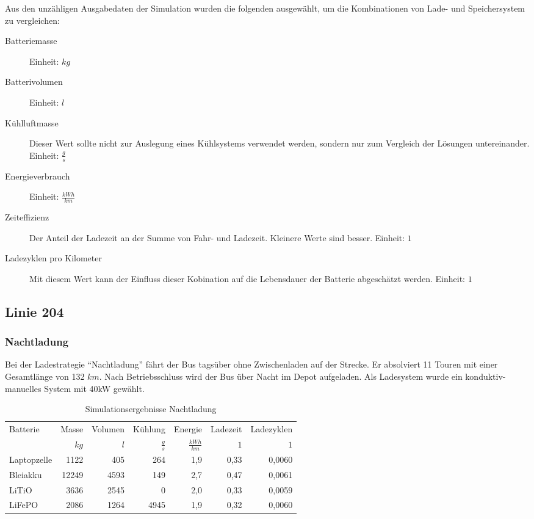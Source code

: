 Aus den unzähligen Ausgabedaten der Simulation wurden die folgenden ausgewählt, um die Kombinationen von Lade- und Speichersystem zu vergleichen:
\begin{description}
	\item[Batteriemasse] Einheit: $kg$
	\item[Batterivolumen] Einheit: $l$
	\item[Kühlluftmasse] Dieser Wert sollte nicht zur Auslegung eines Kühlsystems verwendet werden, sondern nur zum Vergleich der Lösungen untereinander.\\
	Einheit: $\frac{g}{s}$
	\item[Energieverbrauch] Einheit: $\frac{kWh}{km}$
	\item[Zeiteffizienz] Der Anteil der Ladezeit an der Summe von Fahr- und Ladezeit. Kleinere Werte sind besser.
	Einheit: $1$
	\item[Ladezyklen pro Kilometer] Mit diesem Wert kann der Einfluss dieser Kobination auf die Lebensdauer der Batterie abgeschätzt werden.
	Einheit: $1$
\end{description}

\subsection{Linie 204}
\subsubsection{Nachtladung}
Bei der Ladestrategie "`Nachtladung"' fährt der Bus tagsüber ohne Zwischenladen auf der Strecke. Er absolviert 11 Touren mit einer Gesamtlänge von 132 $km$. Nach Betriebsschluss wird der Bus über Nacht im Depot aufgeladen. Als Ladesystem wurde ein konduktiv-manuelles System mit 40kW gewählt.

\begin{table}[h!]\centering
	\begin{tabularx}{\textwidth}{Xrrrrrr}
		\toprule
		Batterie    & Masse & Volumen &       Kühlung &          Energie & Ladezeit & Ladezyklen \\
		            &  $kg$ &     $l$ & $\frac{g}{s}$ & $\frac{kWh}{km}$ &      $1$ &        $1$ \\ \midrule
		Laptopzelle &  1122 &     405 &           264 &              1,9 &       0,33   & 0,0060 \\
		Bleiakku    & 12249 &    4593 &           149 &              2,7 &       0,47   & 0,0061 \\
		LiTiO       &  3636 &    2545 &             0 &              2,0 &       0,33   & 0,0059 \\
		LiFePO      &  2086 &    1264 &          4945 &              1,9 &       0,32   & 0,0060 \\ \bottomrule
	\end{tabularx}
	\caption{Simulationsergebnisse Nachtladung}
\end{table}
\FloatBarrier
